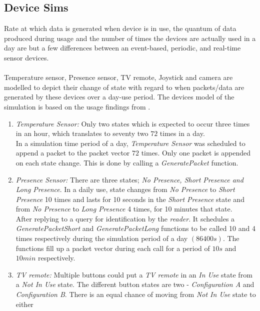 \subsection{Device Sims}
Rate at which data is generated when device is in use, the quantum of data produced
during usage and the number of times the devices are actually used in a day are but a
few differences between an event-based, periodic, and real-time sensor devices.\\\\
Temperature sensor, Presence sensor, TV remote, Joystick and camera are modelled
to depict their change of state with regard to when packets/data are generated by
these devices over a day-use period. The devices model of the simulation is based
on the usage findings from \cite{Maselli}.
\begin{enumerate}
    \renewcommand{\labelenumi}{\alph{enumi}{.}}
\item \textit{Temperature Sensor:} Only two states which is expected to occur three
    times in an hour, which translates to seventy two $72$ times in a day.\\
    In a simulation time period of a day, \textit{Temperature Sensor} was scheduled
    to append a packet to the packet vector $72$ times. Only one packet is appended
    on each state change. This is done by calling a \textit{GeneratePacket} function.
\item \textit{Presence Sensor:} There are three states; \textit{No Presence,
    Short Presence and Long Presence}. In a daily use, state changes from
    \textit{No Presence} to \textit{Short Presence} 10 times and lasts for 10 seconds
    in the \textit{Short Presence} state and from \textit{No Presence} to
    \textit{Long Presence} 4 times, for 10 minutes that state.\\
    After replying to a query for identification by the \textit{reader}. It schedules
    a \textit{GeneratePacketShort} and \textit{GeneratePacketLong} functions to be
    called 10 and 4 times respectively during the simulation period of a day \textit{
    $(86400s)$}. The functions fill up a packet vector during each call for a period
    of \textit{$10s$} and \textit{$10min$} respectively.
\item \textit{TV remote:} Multiple buttons could put a \textit{TV remote} in an
    \textit{In Use} state from a \textit{Not In Use} state. The different button
    states are two - \textit{Configuration A} and \textit{Configuration B}. There is
    an equal chance of moving from \textit{Not In Use} state to either\textit{
}
\end{enumerate}
